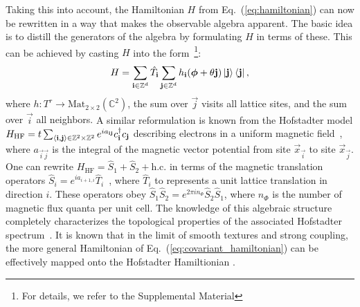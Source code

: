 \documentclass[
    10pt,
    aps,
    prl,
    twocolumn,
    floatfix,
    superscriptaddress
]{revtex4-2}
\newcommand{\revise}[1]{{#1}}
\begin{document}

Taking this into account, the Hamiltonian $H$ from Eq.~(\ref{eq:hamiltonian}) can now be rewritten in a way that makes the observable algebra apparent.
The basic idea is to distill the generators of the algebra by formulating $H$ in terms of these.
This can be achieved by casting $H$ into the form~\footnote{For details, we refer to the Supplemental Material}:
\begin{equation}
    H =  \sum_{\mathbf{i} \in \mathbb{Z}^d} \hat{T}_{\mathbf{i}}  \sum_{\mathbf{j} \in \mathbb{Z}^d} h_{\mathbf{i}}( \boldsymbol{\phi} + \theta \mathbf{j} ) \ket{ \mathbf{j}} \bra{ \mathbf{j}} ,
    \label{eq:covariant_hamiltonian}
\end{equation}
where $h\colon T^r \to \mathrm{Mat}_{2\times2} (\mathbb{C}^2)$,
the sum over $\vec{j}$ visits all lattice sites, and the sum over $\vec{i}$ all neighbors.
\revise{
A similar reformulation is known from the Hofstadter model $H_\mathrm{HF} = t \sum_{\braket{\mathbf{i},\mathbf{j}} \in \mathbb{Z}^{2} \times \mathbb{Z}^2}e^{i a_{\mathbf{i} \mathbf{j}}} c_{\mathbf{i}}^\dagger c_{\mathbf{j}} $ describing electrons in a uniform magnetic field~\cite{Hofstadter1976}, where $a_{\vec{i} \vec{j}}$ is the integral of the magnetic vector potential from site $\vec{x}_\vec{i}$ to site $\vec{x}_\vec{j}$.
One can rewrite $H_\mathrm{HF} = \hat{S}_1 +  \hat{S}_2 + \mathrm{h.c.} $ in terms of the magnetic translation operators $\hat{S}_i = e^{i a_{i+1,i}} \hat{T}_i$~\cite{Zak1964}, where $\hat{T}_i$ to represents a unit lattice translation in direction $i$.
These operators obey $\hat{S}_1 \hat{S}_2 = e^{2\pi i n_\Phi} \hat{S}_2 \hat{S}_1$, where $n_\Phi$ is the number of magnetic flux quanta per unit cell.
The knowledge of this algebraic structure completely characterizes the topological properties of the associated Hofstadter spectrum~\cite{Hofstadter1976, Bellissard1994, Prodan2016}.
It is known that in the limit of smooth textures and strong coupling, the more general Hamiltonian of Eq.~(\ref{eq:covariant_hamiltonian}) can be effectively mapped onto the Hofstadter Hamiltionian \cite{Hamamoto2015,Su2020}.
}
\end{document}
